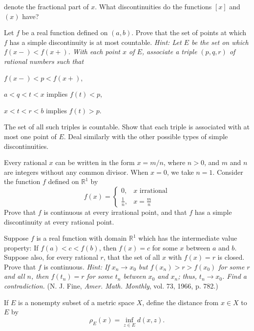 \begin{exercise}
  denote the fractional part of \(x\).
  What discontinuities do the functions \([x]\) and \((x)\) have?
\item
  Let \(f\) be a real function defined on \((a,b)\).
  Prove that the set of points at which \(f\) has a simple discontinuity is at
  most countable.
  \textit{Hint: Let \(E\) be the set on which \(f(x-) < f(x+)\).
    With each point \(x\) of \(E\), associate a triple \((p,q,r)\) of rational
    numbers such that}
  \begin{exercise}[label = (\alph*)]
  \item
    \(f(x-) < p < f(x+)\),
  \item
    \(a < q < t < x\) implies \(f(t) < p\),
  \item
    \(x < t < r < b\) implies \(f(t) > p\).
  \end{exercise}
  The set of all such triples is countable.
  Show that each triple is associated with at most one point of \(E\).
  Deal similarly with the other possible types of simple discontinuities.
\item
  Every rational \(x\) can be written in the form \(x = m/n\), where \(n > 0\),
  and \(m\) and \(n\) are integers without any common divisor.
  When \(x = 0\), we take \(n = 1\).
  Consider the function \(f\) defined on \(\mathbb{R}^1\) by
  \[
  f(x) =
  \begin{cases}
    0, & x\text{ irrational}\\
    \frac{1}{n}, & x = \frac{m}{n}
  \end{cases}
  \]
  Prove that \(f\) is continuous at every irrational point, and that \(f\) has
  a simple discontinuity at every rational point.
\item
  Suppose \(f\) is a real function with domain \(\mathbb{R}^1\) which has the
  intermediate value property: If \(f(a) < c < f(b)\), then \(f(x) = c\) for
  some \(x\) between \(a\) and \(b\).
  Suppose also, for every rational \(r\), that the set of all \(x\) with
  \(f(x) = r\) is closed.
  Prove that \(f\) is continuous.
  \textit{Hint: If \(x_n\to x_0\) but \(f(x_n) > r > f(x_0)\) for some \(r\)
    and all \(n\), then \(f(t_n) = r\) for some \(t_n\) between \(x_0\) and
    \(x_n\); thus, \(t_n\to x_0\).
    Find a contradiction.}
  (N. J. Fine, \textit{Amer. Math. Monthly}, vol. 73, 1966, p. 782.)
\item
  If \(E\) is a nonempty subset of a metric space \(X\), define the distance
  from \(x\in X\) to \(E\) by
  \[
  \rho_E(x) = \inf_{z\in E} d(x, z).
  \]
  \begin{exercise}[label = (\alph*)]

\end{exercise}
\end{exercise}
